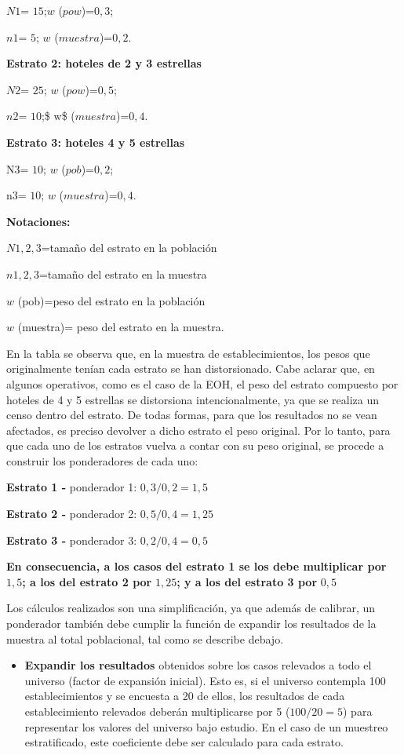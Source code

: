 \documentclass[
]{book}
\providecommand{\tightlist}{%
  \setlength{\itemsep}{0pt}\setlength{\parskip}{0pt}}
\begin{document}
\(N1\)= \(15\);\(w\) (\(pow\))=\(0,3\);

\(n1\)= \(5\); \(w\) (\(muestra\))=\(0,2\).

\textbf{Estrato 2: hoteles de 2 y 3 estrellas}

\(N2\)= \(25\); \(w\) (\(pow\))=\(0,5\);

\(n2\)= \(10\);\$ w\$ (\(muestra\))=\(0,4\).

\textbf{Estrato 3: hoteles 4 y 5 estrellas}

N3= \(10\); \(w\) (\(pob\))=\(0,2\);

n3= \(10\); \(w\) (\(muestra\))=\(0,4\).

\textbf{Notaciones:}

\(N1,2,3\)=tamaño del estrato en la población

\(n1,2,3\)=tamaño del estrato en la muestra

\(w\) (pob)=peso del estrato en la población

\(w\) (muestra)= peso del estrato en la muestra.

En la tabla se observa que, en la muestra de establecimientos, los pesos que originalmente tenían cada estrato se han distorsionado. Cabe aclarar que, en algunos operativos, como es el caso de la EOH, el peso del estrato compuesto por hoteles de 4 y 5 estrellas se distorsiona intencionalmente, ya que se realiza un censo dentro del estrato. De todas formas, para que los resultados no se vean afectados, es preciso devolver a dicho estrato el peso original. Por lo tanto, para que cada uno de los estratos vuelva a contar con su peso original, se procede a construir los ponderadores de cada uno:

\textbf{Estrato 1 -} ponderador 1: \(0,3/0,2=1,5\)

\textbf{Estrato 2 -} ponderador 2: \(0,5/0,4=1,25\)

\textbf{Estrato 3 -} ponderador 3: \(0,2/0,4=0,5\)

\textbf{En consecuencia, a los casos del estrato 1 se los debe multiplicar por} \(1,5\)\textbf{; a los del estrato 2 por} \(1,25\)\textbf{; y a los del estrato 3 por} \(0,5\)

Los cálculos realizados son una simplificación, ya que además de calibrar, un ponderador también debe cumplir la función de expandir los resultados de la muestra al total poblacional, tal como se describe debajo.

\begin{itemize}
\tightlist
\item
  \textbf{Expandir los resultados} obtenidos sobre los casos relevados a todo el universo (factor de expansión inicial). Esto es, si el universo contempla 100 establecimientos y se encuesta a 20 de ellos, los resultados de cada establecimiento relevados deberán multiplicarse por 5 (\(100/20=5\)) para representar los valores del universo bajo estudio. En el caso de un muestreo estratificado, este coeficiente debe ser calculado para cada estrato.
\end{itemize}
\end{document}
